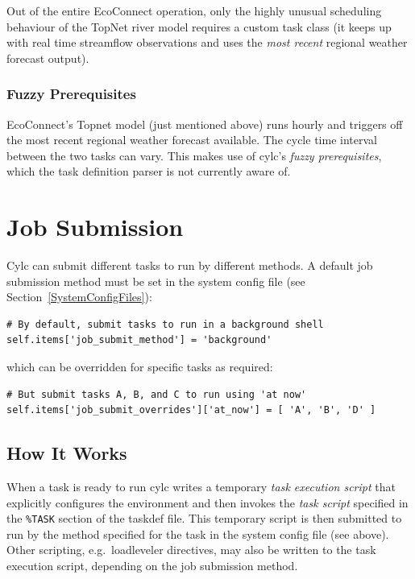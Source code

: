 \documentclass[11pt,a4paper]{article}
\begin{document}
Out of the entire EcoConnect operation, only the highly unusual
scheduling behaviour of the TopNet river model requires a custom task
class (it keeps up with real time streamflow observations and uses
the {\em most recent} regional weather forecast output). 

\subsubsection{Fuzzy Prerequisites}

EcoConnect's Topnet model (just mentioned above) runs hourly and
triggers off the most recent regional weather forecast available.
The cycle time interval between the two tasks can vary. This makes 
use of cylc's {\em fuzzy prerequisites}, which the task definition
parser is not currently aware of.


\pagebreak


\pagebreak
\section{Job Submission}
\label{JobSubmission}

Cylc can submit different tasks to run by different methods.  A default
job submission method must be set in the system config file (see
Section~\ref{SystemConfigFiles}):
 
\lstset{language=Python}

\begin{lstlisting}
# By default, submit tasks to run in a background shell
self.items['job_submit_method'] = 'background'
\end{lstlisting}
 
which can be overridden for specific tasks as required:

\begin{lstlisting}
# But submit tasks A, B, and C to run using 'at now'
self.items['job_submit_overrides']['at_now'] = [ 'A', 'B', 'D' ]
\end{lstlisting}

\subsection{How It Works}
\label{HowItWorks}

\lstset{language=cylctaskdef}

When a task is ready to run cylc writes a temporary {\em task execution
script} that explicitly configures the environment and then invokes the
{\em task script} specified in the \lstinline=%TASK= section of the
taskdef file. This temporary script is then submitted to run by the
method specified for the task in the system config file (see above).
Other scripting, e.g.\ loadleveler directives, may also be written to
the task execution script, depending on the job submission method.
\end{document}
